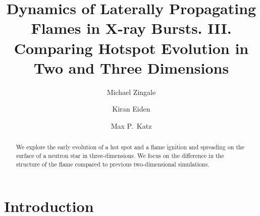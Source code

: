 \documentclass[twocolumn,times,tighten]{aastex631}
\begin{document}
\title{Dynamics of Laterally Propagating Flames in X-ray Bursts. III. Comparing Hotspot Evolution in Two and Three Dimensions}


\author[0000-0001-8401-030X]{Michael Zingale}


\author[0000-0001-6191-4285]{Kiran Eiden}



\author[0000-0003-0439-4556]{Max P.\ Katz}




\begin{abstract}
We explore the early evolution of a hot spot and a flame ignition and
spreading on the surface of a neutron star in three-dimensions.  We
focus on the difference in the structure of the flame compared to
previous two-dimensional simulations.\end{abstract}


\section{Introduction}\label{Sec:Introduction}
\end{document}
